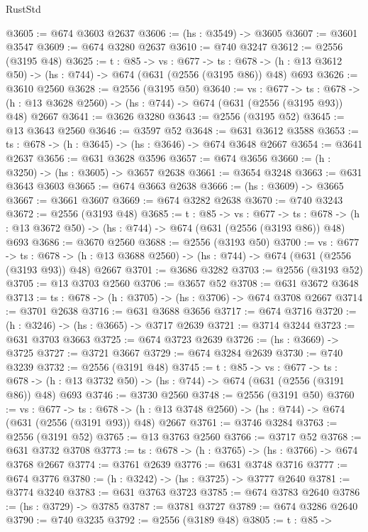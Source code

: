 \begin{lexlean}{RustStd}
\begin{coremodule}
@3605 := @674 @3603 @2637
@3606 := (hs : @3549) -> @3605
@3607 := @3601 @3547
@3609 := @674 @3280 @2637
@3610 := @740 @3247
@3612 := @2556 (@3195 @48)
@3625 := {t : @85} ->
  {vs : @677} ->
  {ts : @678} -> (h : @13 @3612 @50) -> (hs : @744) -> @674 (@631 (@2556 (@3195 @86)) @48) @693
@3626 := @3610 @2560
@3628 := @2556 (@3195 @50)
@3640 := {vs : @677} ->
  {ts : @678} -> (h : @13 @3628 @2560) -> (hs : @744) -> @674 (@631 (@2556 (@3195 @93)) @48) @2667
@3641 := @3626 @3280
@3643 := @2556 (@3195 @52)
@3645 := @13 @3643 @2560
@3646 := @3597 @52
@3648 := @631 @3612 @3588
@3653 := {ts : @678} -> (h : @3645) -> (hs : @3646) -> @674 @3648 @2667
@3654 := @3641 @2637
@3656 := @631 @3628 @3596
@3657 := @674 @3656
@3660 := (h : @3250) -> (hs : @3605) -> @3657 @2638
@3661 := @3654 @3248
@3663 := @631 @3643 @3603
@3665 := @674 @3663 @2638
@3666 := (hs : @3609) -> @3665
@3667 := @3661 @3607
@3669 := @674 @3282 @2638
@3670 := @740 @3243
@3672 := @2556 (@3193 @48)
@3685 := {t : @85} ->
  {vs : @677} ->
  {ts : @678} -> (h : @13 @3672 @50) -> (hs : @744) -> @674 (@631 (@2556 (@3193 @86)) @48) @693
@3686 := @3670 @2560
@3688 := @2556 (@3193 @50)
@3700 := {vs : @677} ->
  {ts : @678} -> (h : @13 @3688 @2560) -> (hs : @744) -> @674 (@631 (@2556 (@3193 @93)) @48) @2667
@3701 := @3686 @3282
@3703 := @2556 (@3193 @52)
@3705 := @13 @3703 @2560
@3706 := @3657 @52
@3708 := @631 @3672 @3648
@3713 := {ts : @678} -> (h : @3705) -> (hs : @3706) -> @674 @3708 @2667
@3714 := @3701 @2638
@3716 := @631 @3688 @3656
@3717 := @674 @3716
@3720 := (h : @3246) -> (hs : @3665) -> @3717 @2639
@3721 := @3714 @3244
@3723 := @631 @3703 @3663
@3725 := @674 @3723 @2639
@3726 := (hs : @3669) -> @3725
@3727 := @3721 @3667
@3729 := @674 @3284 @2639
@3730 := @740 @3239
@3732 := @2556 (@3191 @48)
@3745 := {t : @85} ->
  {vs : @677} ->
  {ts : @678} -> (h : @13 @3732 @50) -> (hs : @744) -> @674 (@631 (@2556 (@3191 @86)) @48) @693
@3746 := @3730 @2560
@3748 := @2556 (@3191 @50)
@3760 := {vs : @677} ->
  {ts : @678} -> (h : @13 @3748 @2560) -> (hs : @744) -> @674 (@631 (@2556 (@3191 @93)) @48) @2667
@3761 := @3746 @3284
@3763 := @2556 (@3191 @52)
@3765 := @13 @3763 @2560
@3766 := @3717 @52
@3768 := @631 @3732 @3708
@3773 := {ts : @678} -> (h : @3765) -> (hs : @3766) -> @674 @3768 @2667
@3774 := @3761 @2639
@3776 := @631 @3748 @3716
@3777 := @674 @3776
@3780 := (h : @3242) -> (hs : @3725) -> @3777 @2640
@3781 := @3774 @3240
@3783 := @631 @3763 @3723
@3785 := @674 @3783 @2640
@3786 := (hs : @3729) -> @3785
@3787 := @3781 @3727
@3789 := @674 @3286 @2640
@3790 := @740 @3235
@3792 := @2556 (@3189 @48)
@3805 := {t : @85} ->

\end{coremodule}
\end{lexlean}
